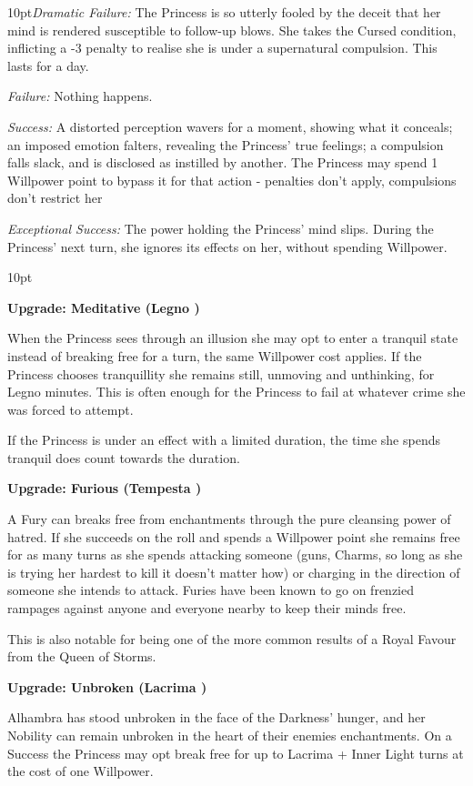     \begin{myindentpar}{10pt}\emph{Dramatic Failure:} The Princess is so utterly fooled by the deceit that her mind is rendered susceptible to follow-up blows. She takes the Cursed condition, inflicting a -3 penalty to realise she is under a supernatural compulsion. This lasts for a day. 

    \emph{Failure:} Nothing happens.

    \emph{Success:} A distorted perception wavers for a moment, showing what it conceals; an imposed emotion falters, revealing the Princess’ true feelings; a compulsion falls slack, and is disclosed as instilled by another. The Princess may spend 1 Willpower point to bypass it for that action - penalties don’t apply, compulsions don’t restrict her

    \emph{Exceptional Success:}  The power holding the Princess’ mind slips. During the Princess’ next turn, she ignores its effects on her, without spending Willpower.\end{myindentpar}

\begin{myindentpar}{10pt}

\textbf{Upgrade: Meditative (Legno \textbullet\textbullet\textbullet)}

When the Princess sees through an illusion she may opt to enter a tranquil state instead of breaking free for a turn, the same Willpower cost applies. If the Princess chooses tranquillity she remains still, unmoving and unthinking, for Legno minutes. This is often enough for the Princess to fail at whatever crime she was forced to attempt. 

If the Princess is under an effect with a limited duration, the time she spends tranquil does count towards the duration.

\textbf{Upgrade: Furious (Tempesta \textbullet\textbullet\textbullet)}

A Fury can breaks free from enchantments through the pure cleansing power of hatred. If she succeeds on the roll and spends a Willpower point she remains free for as many turns as she spends attacking someone (guns, Charms, so long as she is trying her hardest to kill it doesn't matter how) or charging in the direction of someone she intends to attack. Furies have been known to go on frenzied rampages against anyone and everyone nearby to keep their minds free.

This is also notable for being one of the more common results of a Royal Favour from the Queen of Storms. 

\textbf{Upgrade: Unbroken (Lacrima \textbullet\textbullet\textbullet\textbullet)}

Alhambra has stood unbroken in the face of the Darkness' hunger, and her Nobility can remain unbroken in the heart of their enemies enchantments. On a Success the Princess may opt break free for up to Lacrima + Inner Light turns at the cost of one Willpower. \end{myindentpar}

